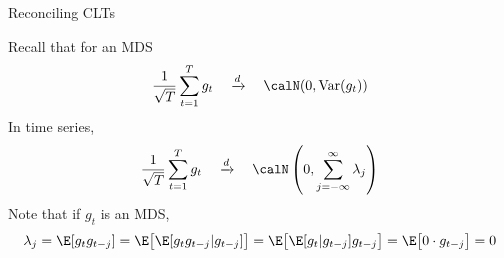 \documentclass[handout]{beamer}
\newcommand{\Var}{\operatorname{Var}}
\newcommand{\dto}{\xrightarrow{d}}
\newcommand{\sumtT}{\sum^T_{t=1}}
\newcommand{\limT}{\lim_{T\rightarrow\infty}}
\begin{document}
\begin{frame}[shrink]{Reconciling CLTs}

Recall that for an MDS
\begin{align*}
  \frac{1}{\sqrt{T}}
  \sumtT
  g_t
  \quad\dto\quad
  \calN(0,\Var(g_t))
\end{align*}
In time series,
\begin{align*}
  \frac{1}{\sqrt{T}}
  \sumtT
  g_t
  \quad\dto\quad
  \calN\left(
  0,
  \sum_{j=-\infty}^\infty
  \lambda_j
  \right)
\end{align*}
Note that if $g_t$ is an MDS,
\begin{align*}
  \lambda_j
  =
  \E[g_tg_{t-j}]
  =
  \E\big[
    \E[
      g_tg_{t-j}|g_{t-j}
    ]
  \big]
  =
  \E\big[
    \E[
      g_t|g_{t-j}
    ]g_{t-j}
  \big]
  =
  \E\big[
    0
    \cdot
    g_{t-j}
  \big]
  =
  0
\end{align*}
\end{frame}







\end{document}

